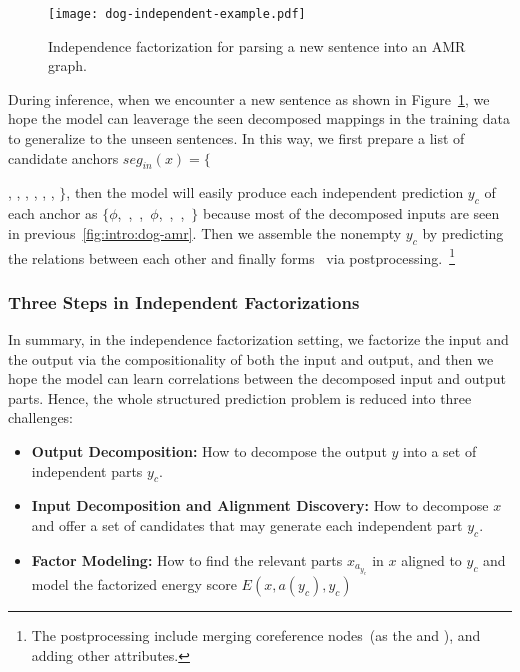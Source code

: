 \begin{figure}[!tbp]
\begin{center}
\texttt{[image: dog-independent-example.pdf]}
\end{center}
\caption{\label{fig:intro:independent-example}Independence
  factorization for parsing a new sentence  into an AMR graph.}
\end{figure}

During inference, when we encounter a new sentence as shown in
Figure~\ref{fig:intro:independent-example}, we hope the model can
leaverage the seen decomposed mappings in the training data to
generalize to the unseen sentences. In this way, we first prepare a
list of candidate anchors $seg_{in}(x)=\{${,
  , , , ,
  , $\}$, then the model will easily produce
  each independent prediction $y_{c}$ of each anchor as
  $\{\phi$,~,~,~$\phi$,~,~,~$\}$
  because most of the decomposed inputs are seen in
  previous~\autoref{fig:intro:dog-amr}. Then we assemble the nonempty
  $y_{c}$ by predicting the relations between each other and finally
  forms \OUT~via postprocessing.~\footnote{The postprocessing include
    merging coreference nodes~(as the  and ), and adding other
    attributes.}

\subsubsection{Three Steps in Independent Factorizations}
\label{sssec:intro:steps-inductive-bias}
In summary, in the independence factorization setting, we factorize
the input and the output via the compositionality of both the input
and output, and then we hope the model can learn correlations between
the decomposed input and output parts. Hence, the whole structured
prediction problem is reduced into three challenges:

\begin{itemize}
\item \textbf{Output Decomposition:} How to decompose the output $y$
  into a set of independent parts $y_{c}$.

\item \textbf{Input Decomposition and Alignment Discovery:} How to decompose $x$ and offer a
  set of candidates that may generate each independent part $y_{c}$.
\item \textbf{Factor Modeling:} How to find the relevant parts
  $x_{a_{y_{c}}}$ in $x$ aligned to ${y_{c}}$ and model the factorized
  energy score $E(x, a(y_{c}), y_{c})$
\end{itemize}

}
